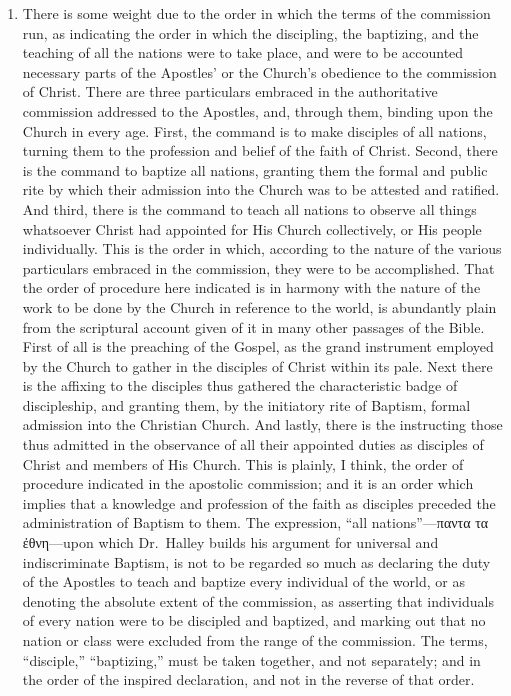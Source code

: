 \documentclass[]{book}
\begin{document}
\begin{enumerate}
\def\labelenumi{\arabic{enumi}.}
\item
  There is some weight due to the order in which the terms of the commission run, as indicating the order in which the discipling, the baptizing, and the teaching of all the nations were to take place, and were to be accounted necessary parts of the Apostles' or the Church's obedience to the commission of Christ. There are three particulars embraced in the authoritative commission addressed to the Apostles, and, through them, binding upon the Church in every age. First, the command is to make disciples of all nations, turning them to the profession and belief of the faith of Christ. Second, there is the command to baptize all nations, granting them the formal and public rite by which their admission into the Church was to be attested and ratified. And third, there is the command to teach all nations to observe all things whatsoever Christ had appointed for His Church collectively, or His people individually. This is the order in which, according to the nature of the various particulars embraced in the commission, they were to be accomplished. That the order of procedure here indicated is in harmony with the nature of the work to be done by the Church in reference to the world, is abundantly plain from the scriptural account given of it in many other passages of the Bible. First of all is the preaching of the Gospel, as the grand instrument employed by the Church to gather in the disciples of Christ within its pale. Next there is the affixing to the disciples thus gathered the characteristic badge of discipleship, and granting them, by the initiatory rite of Baptism, formal admission into the Christian Church. And lastly, there is the instructing those thus admitted in the observance of all their appointed duties as disciples of Christ and members of His Church. This is plainly, I think, the order of procedure indicated in the apostolic commission; and it is an order which implies that a knowledge and profession of the faith as disciples preceded the administration of Baptism to them. The expression, ``all nations''---παντα τα ἐθνη---upon which Dr.~Halley builds his argument for universal and indiscriminate Baptism, is not to be regarded so much as declaring the duty of the Apostles to teach and baptize every individual of the world, or as denoting the absolute extent of the commission, as asserting that individuals of every nation were to be discipled and baptized, and marking out that no nation or class were excluded from the range of the commission. The terms, ``disciple,'' ``baptizing,'' must be taken together, and not separately; and in the order of the inspired declaration, and not in the reverse of that order.

\end{enumerate}
\end{document}
